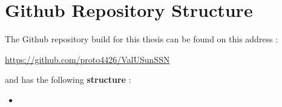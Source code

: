 \documentclass[11pt,a4paper,openany ]{book}
\begin{document}
\chapter{Github Repository Structure}\label{appgit}

The Github repository build for this thesis can be found on this address :

\begin{center}
\url{https://github.com/proto4426/ValUSunSSN}
\end{center}

and has the following \textbf{structure} : 

\begin{itemize}
\item 
\end{itemize}



\setlength{\parindent}{5em}
\setlength{\parskip}{2em}
\renewcommand{\baselinestretch}{4.0}


\end{document}
